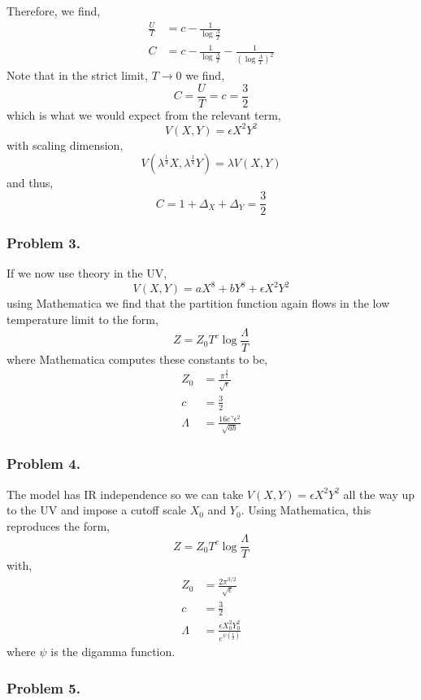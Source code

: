 \documentclass[12pt]{article}
\begin{document}
Therefore, we find,
\begin{align*}
\frac{U}{T} & = c - \frac{1}{\log{\frac{\Lambda}{T}}}
\\
C & = c  - \frac{1}{\log{\frac{\Lambda}{T}}} - \frac{1}{(\log{\frac{\Lambda}{T}})^2} 
\end{align*}
Note that in the strict limit, $T \to 0$ we find,
\[ C = \frac{U}{T} = c = \frac{3}{2} \]
which is what we would expect from the relevant term,
\[ V(X,Y) = \epsilon X^2 Y^2 \]
with scaling dimension,
\[ V(\lambda^{\frac{1}{4}} X, \lambda^{\frac{1}{4}} Y) = \lambda V(X, Y) \]
and thus,
\[ C = 1 + \Delta_X + \Delta_Y = \frac{3}{2} \]

\subsubsection{Problem 3.}

If we now use theory in the UV,
\[ V(X, Y) = a X^8 + b Y^8 + \epsilon X^2 Y^2 \]
using Mathematica we find that the partition function again flows in the low temperature limit to the form,
\[ Z = Z_0 T^c \log{\frac{\Lambda}{T}} \]
where Mathematica computes these constants to be,
\begin{align*}
Z_0 & = \frac{\pi^{\frac{3}{2}}}{\sqrt{\epsilon}}
\\
c & = \frac{3}{2}
\\
\Lambda & = \frac{16 e^{\gamma} \epsilon^2}{\sqrt{ab}} 
\end{align*} 

\subsubsection{Problem 4.}

The model has IR independence so we can take $V(X, Y) = \epsilon X^2 Y^2$ all the way up to the UV and impose a cutoff scale $X_0$ and $Y_0$. Using Mathematica, this reproduces the form,
\[ Z = Z_0 T^c \log{\frac{\Lambda}{T}} \]
with,
\begin{align*}
Z_0 & = \frac{2 \pi^{3/2}}{\sqrt{\epsilon}} 
\\
c & = \frac{3}{2}
\\
\Lambda & = \frac{\epsilon X_0^2 Y_0^2}{e^{\psi(\tfrac{1}{2})}} 
\end{align*}
where $\psi$ is the digamma function. 

\subsubsection{Problem 5.}
\end{document}
